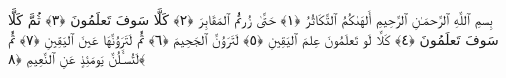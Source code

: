 
  
    
  
    
    

\nopagebreak
  بِسمِ ٱللَّهِ ٱلرَّحمَـٰنِ ٱلرَّحِيمِ
  أَلهَىٰكُمُ ٱلتَّكَاثُرُ ﴿١﴾
 حَتَّىٰ زُرتُمُ ٱلمَقَابِرَ ﴿٢﴾
 كَلَّا سَوفَ تَعلَمُونَ ﴿٣﴾
 ثُمَّ كَلَّا سَوفَ تَعلَمُونَ ﴿٤﴾
 كَلَّا لَو تَعلَمُونَ عِلمَ ٱليَقِينِ ﴿٥﴾
 لَتَرَوُنَّ ٱلجَحِيمَ ﴿٦﴾
 ثُمَّ لَتَرَوُنَّهَا عَينَ ٱليَقِينِ ﴿٧﴾
 ثُمَّ لَتُسـَٔلُنَّ يَومَئِذٍ عَنِ ٱلنَّعِيمِ ﴿٨﴾
 
